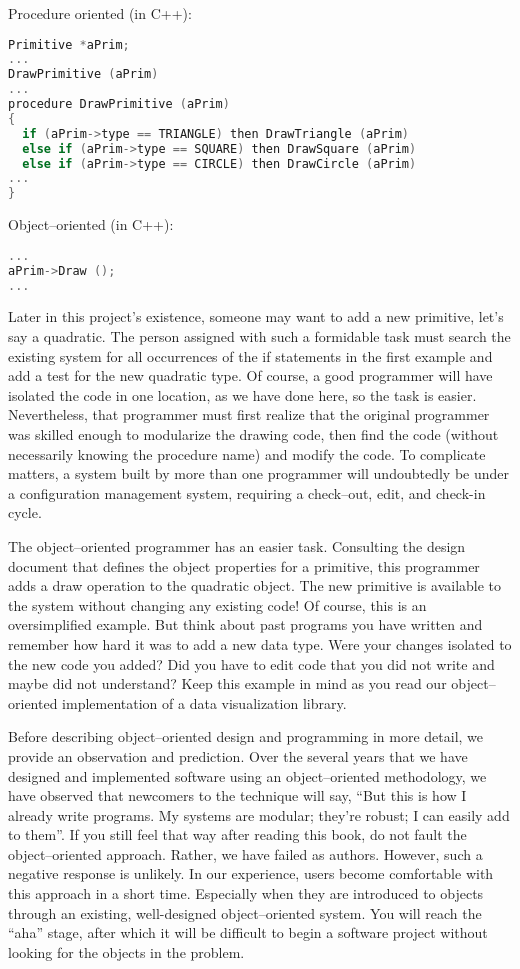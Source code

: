 Procedure oriented (in C++):

\begin{lstlisting}[language=C++, caption={Procedure oriented.}]
Primitive *aPrim;
...
DrawPrimitive (aPrim)
...
procedure DrawPrimitive (aPrim)
{
  if (aPrim->type == TRIANGLE) then DrawTriangle (aPrim)
  else if (aPrim->type == SQUARE) then DrawSquare (aPrim)
  else if (aPrim->type == CIRCLE) then DrawCircle (aPrim)
...
}
\end{lstlisting}

Object--oriented (in C++):

\begin{lstlisting}[language=C++, caption={Object--oriented.}]
...
aPrim->Draw ();
...
\end{lstlisting}

Later in this project's existence, someone may want to add a new primitive, let's say a quadratic. The person assigned with such a formidable task must search the existing system for all occurrences of the if statements in the first example and add a test for the new quadratic type. Of course, a good programmer will have isolated the code in one location, as we have done here, so the task is easier. Nevertheless, that programmer must first realize that the original programmer was skilled enough to modularize the drawing code, then find the code (without necessarily knowing the procedure name) and modify the code. To complicate matters, a system built by more than one programmer will undoubtedly be under a configuration management system, requiring a check--out, edit, and check-in cycle.

The object--oriented programmer has an easier task. Consulting the design document that defines the object properties for a primitive, this programmer adds a draw operation to the quadratic object. The new primitive is available to the system without changing any existing code! Of course, this is an oversimplified example. But think about past programs you have written and remember how hard it was to add a new data type. Were your changes isolated to the new code you added? Did you have to edit code that you did not write and maybe did not understand? Keep this example in mind as you read our object--oriented implementation of a data visualization library.

Before describing object--oriented design and programming in more detail, we provide an observation and prediction. Over the several years that we have designed and implemented software using an object--oriented methodology, we have observed that newcomers to the technique will say, ``But this is how I already write programs. My systems are modular; they're robust; I can easily add to them''. If you still feel that way after reading this book, do not fault the object--oriented approach. Rather, we have failed as authors. However, such a negative response is unlikely. In our experience, users become comfortable with this approach in a short time. Especially when they are introduced to objects through an existing, well-designed object--oriented system. You will reach the ``aha'' stage, after which it will be difficult to begin a software project without looking for the objects in the problem.

